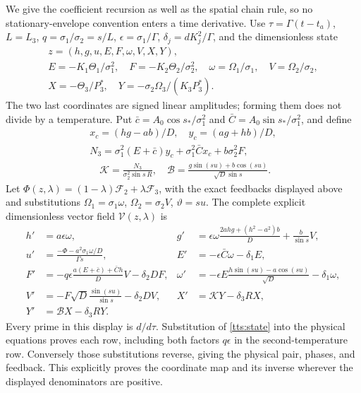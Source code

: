 We give the coefficient recursion as well as the spatial chain rule,
so no stationary-envelope convention enters a time derivative.
Use $\tau=\Gamma(t-t_a)$, $L=L_3$,
$q=\sigma_1/\sigma_2=s/L$, $\epsilon=\sigma_1/\Gamma$,
$\delta_j=dK_j^2/\Gamma$, and the dimensionless state
\begin{equation}\label{tts:state}
 \begin{gathered}
 z=(h,g,u,E,F,\omega,V,X,Y),\\
 E=-K_1\Theta_1/\sigma_1^2,\quad
 F=-K_2\Theta_2/\sigma_2^2,\quad
 \omega=\Omega_1/\sigma_1,\quad V=\Omega_2/\sigma_2,\\
 X=-\Theta_3/P_3^*,\quad Y=-\sigma_2\Omega_3/(K_3P_3^*).
 \end{gathered}
\end{equation}
The two last coordinates are signed linear amplitudes; forming them
does not divide by a temperature. Put
$\bar c=A_0\cos s_*/\sigma_1^2$ and
$\bar C=A_0\sin s_*/\sigma_1^2$, and define
\[
 \begin{gathered}
 x_c=(hg-ab)/D,\quad y_c=(ag+hb)/D,\\
 N_3=\sigma_1^2(E+\bar c)y_c+\sigma_1^2\bar Cx_c
                                      +b\sigma_2^2F,\\
 \quad\mathcal K=\frac{N_3}{\sigma_2^2\sin s\,R},
 \quad\mathcal B=\frac{g\sin(su)+b\cos(su)}{\sqrt D\sin s}.
 \end{gathered}
\]
Let $\Phi(z,\lambda)=(1-\lambda)\mathcal F_2+
\lambda\mathcal F_3$, with the exact feedbacks displayed above
and substitutions $\Omega_1=\sigma_1\omega$,
$\Omega_2=\sigma_2V$, $\vartheta=su$. The complete explicit
dimensionless vector field $\mathcal V(z,\lambda)$ is
\begin{align}\label{tts:vectorfield}
 h'&=a\epsilon\omega,&
 g'&=\epsilon\omega\frac{2ahg+(h^2-a^2)b}{D}
                                  +\frac b{\sin s}V,\nonumber\\
 u'&=\frac{-\Phi-a^2\sigma_1\omega/D}{\Gamma s},&
 E'&=-\epsilon\bar C\omega-\delta_1E,\nonumber\\
 F'&=-q\epsilon\frac{a(E+\bar c)+\bar Ch}{D}V-\delta_2DF,&
 \omega'&=-\epsilon E\frac{h\sin(su)-a\cos(su)}{\sqrt D}
                                               -\delta_1\omega,\\
 V'&=-F\sqrt D\frac{\sin(su)}{\sin s}-\delta_2DV,&
 X'&=\mathcal K Y-\delta_3RX,\nonumber\\
 Y'&=\mathcal B X-\delta_3RY.&&\nonumber
\end{align}
Every prime in this display is $d/d\tau$. Substitution of
\eqref{tts:state} into the physical equations proves each row,
including both factors $q\epsilon$ in the second-temperature row.
Conversely those substitutions reverse, giving the physical pair,
phases, and feedback. This explicitly proves the coordinate map and
its inverse wherever the displayed denominators are positive.

